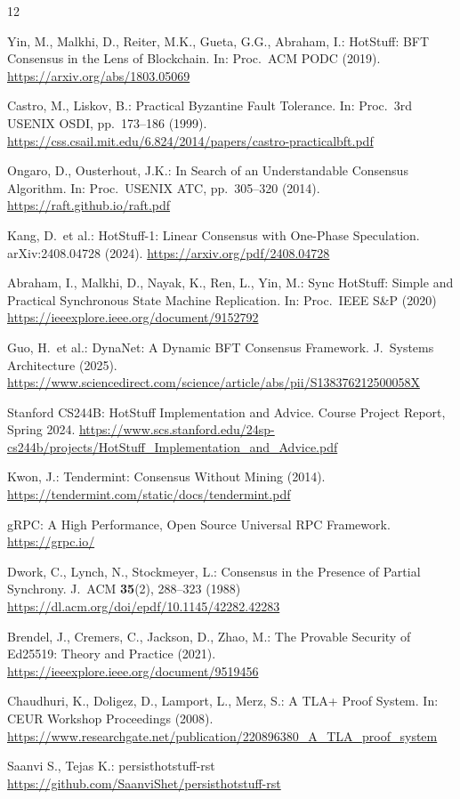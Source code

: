 \documentclass{SVProc}
\begin{document}
\begin{thebibliography}{12}

Yin, M., Malkhi, D., Reiter, M.K., Gueta, G.G., Abraham, I.:
HotStuff: BFT Consensus in the Lens of Blockchain.
In: Proc.\ ACM PODC (2019).
\url{https://arxiv.org/abs/1803.05069}

Castro, M., Liskov, B.:
Practical Byzantine Fault Tolerance.
In: Proc.\ 3rd USENIX OSDI, pp.~173--186 (1999).
\url{https://css.csail.mit.edu/6.824/2014/papers/castro-practicalbft.pdf}

Ongaro, D., Ousterhout, J.K.:
In Search of an Understandable Consensus Algorithm.
In: Proc.\ USENIX ATC, pp.~305--320 (2014).
\url{https://raft.github.io/raft.pdf}

Kang, D.\ et al.:
HotStuff-1: Linear Consensus with One-Phase Speculation.
arXiv:2408.04728 (2024).
\url{https://arxiv.org/pdf/2408.04728}

Abraham, I., Malkhi, D., Nayak, K., Ren, L., Yin, M.:
Sync HotStuff: Simple and Practical Synchronous State Machine
Replication.
In: Proc.\ IEEE S\&P (2020)
\url{https://ieeexplore.ieee.org/document/9152792}

Guo, H.\ et al.:
DynaNet: A Dynamic BFT Consensus Framework.
J.\ Systems Architecture (2025).
\url{https://www.sciencedirect.com/science/article/abs/pii/S138376212500058X}

Stanford CS244B:
HotStuff Implementation and Advice.
Course Project Report, Spring 2024.
\url{https://www.scs.stanford.edu/24sp-cs244b/projects/HotStuff_Implementation_and_Advice.pdf}

Kwon, J.:
Tendermint: Consensus Without Mining (2014).
\url{https://tendermint.com/static/docs/tendermint.pdf}

gRPC: A High Performance, Open Source Universal RPC Framework.
\url{https://grpc.io/}

Dwork, C., Lynch, N., Stockmeyer, L.:
Consensus in the Presence of Partial Synchrony.
J.\ ACM \textbf{35}(2), 288--323 (1988)
\url{https://dl.acm.org/doi/epdf/10.1145/42282.42283}

Brendel, J., Cremers, C., Jackson, D., Zhao, M.:
The Provable Security of Ed25519: Theory and Practice (2021).
\url{https://ieeexplore.ieee.org/document/9519456}

Chaudhuri, K., Doligez, D., Lamport, L., Merz, S.:
A TLA+ Proof System.
In: CEUR Workshop Proceedings (2008).
\url{https://www.researchgate.net/publication/220896380_A_TLA_proof_system}

Saanvi S., Tejas K.: 
persisthotstuff-rst
\url{https://github.com/SaanviShet/persisthotstuff-rst}

\end{thebibliography}
\end{document}
